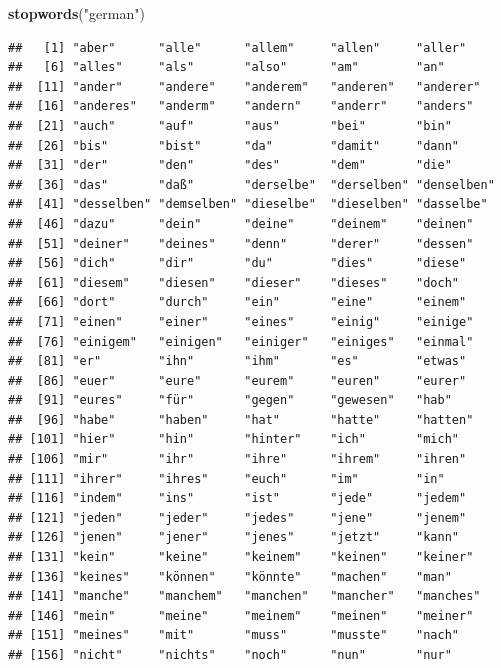 \documentclass[]{book}
\newenvironment{Shaded}{\begin{snugshade}}{\end{snugshade}}
\newcommand{\KeywordTok}[1]{\textcolor[rgb]{0.13,0.29,0.53}{\textbf{{#1}}}}
\newcommand{\StringTok}[1]{\textcolor[rgb]{0.31,0.60,0.02}{{#1}}}
\newcommand{\NormalTok}[1]{{#1}}
\begin{document}
\begin{Shaded}
\begin{Highlighting}[]
\KeywordTok{stopwords}\NormalTok{(}\StringTok{"german"}\NormalTok{)}
\end{Highlighting}
\end{Shaded}

\begin{verbatim}
##   [1] "aber"      "alle"      "allem"     "allen"     "aller"    
##   [6] "alles"     "als"       "also"      "am"        "an"       
##  [11] "ander"     "andere"    "anderem"   "anderen"   "anderer"  
##  [16] "anderes"   "anderm"    "andern"    "anderr"    "anders"   
##  [21] "auch"      "auf"       "aus"       "bei"       "bin"      
##  [26] "bis"       "bist"      "da"        "damit"     "dann"     
##  [31] "der"       "den"       "des"       "dem"       "die"      
##  [36] "das"       "daß"       "derselbe"  "derselben" "denselben"
##  [41] "desselben" "demselben" "dieselbe"  "dieselben" "dasselbe" 
##  [46] "dazu"      "dein"      "deine"     "deinem"    "deinen"   
##  [51] "deiner"    "deines"    "denn"      "derer"     "dessen"   
##  [56] "dich"      "dir"       "du"        "dies"      "diese"    
##  [61] "diesem"    "diesen"    "dieser"    "dieses"    "doch"     
##  [66] "dort"      "durch"     "ein"       "eine"      "einem"    
##  [71] "einen"     "einer"     "eines"     "einig"     "einige"   
##  [76] "einigem"   "einigen"   "einiger"   "einiges"   "einmal"   
##  [81] "er"        "ihn"       "ihm"       "es"        "etwas"    
##  [86] "euer"      "eure"      "eurem"     "euren"     "eurer"    
##  [91] "eures"     "für"       "gegen"     "gewesen"   "hab"      
##  [96] "habe"      "haben"     "hat"       "hatte"     "hatten"   
## [101] "hier"      "hin"       "hinter"    "ich"       "mich"     
## [106] "mir"       "ihr"       "ihre"      "ihrem"     "ihren"    
## [111] "ihrer"     "ihres"     "euch"      "im"        "in"       
## [116] "indem"     "ins"       "ist"       "jede"      "jedem"    
## [121] "jeden"     "jeder"     "jedes"     "jene"      "jenem"    
## [126] "jenen"     "jener"     "jenes"     "jetzt"     "kann"     
## [131] "kein"      "keine"     "keinem"    "keinen"    "keiner"   
## [136] "keines"    "können"    "könnte"    "machen"    "man"      
## [141] "manche"    "manchem"   "manchen"   "mancher"   "manches"  
## [146] "mein"      "meine"     "meinem"    "meinen"    "meiner"   
## [151] "meines"    "mit"       "muss"      "musste"    "nach"     
## [156] "nicht"     "nichts"    "noch"      "nun"       "nur"      

\end{verbatim}
\end{document}
